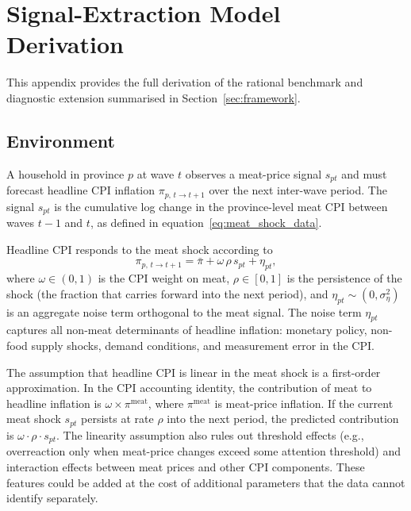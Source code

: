 
\section{Signal-Extraction Model Derivation}\label{app:model}

This appendix provides the full derivation of the rational
benchmark and diagnostic extension summarised in
Section~\ref{sec:framework}.

\subsection{Environment}

A household in province $p$ at wave $t$ observes a meat-price
signal $s_{pt}$ and must forecast headline CPI inflation
$\pi_{p,\,t \to t+1}$ over the next inter-wave period.
The signal $s_{pt}$ is the cumulative log change in the
province-level meat CPI between waves $t-1$ and $t$, as
defined in equation~\eqref{eq:meat_shock_data}.

Headline CPI responds to the meat shock according to
\[
  \pi_{p,\,t \to t+1}
  = \bar{\pi} + \omega\,\rho\,s_{pt} + \eta_{pt},
\]
where $\omega \in (0,1)$ is the CPI weight on meat,
$\rho \in [0,1]$ is the persistence of the shock
(the fraction that carries forward into the next period),
and $\eta_{pt} \sim (0, \sigma_\eta^2)$ is an aggregate
noise term orthogonal to the meat signal.
The noise term $\eta_{pt}$ captures all non-meat determinants
of headline inflation: monetary policy, non-food supply shocks,
demand conditions, and measurement error in the CPI.

The assumption that headline CPI is linear in the meat shock is
a first-order approximation.
In the CPI accounting identity, the contribution of meat to
headline inflation is $\omega \times \pi^{\text{meat}}$, where
$\pi^{\text{meat}}$ is meat-price inflation.
If the current meat shock $s_{pt}$ persists at rate $\rho$
into the next period, the predicted contribution is
$\omega \cdot \rho \cdot s_{pt}$.
The linearity assumption also rules out threshold effects
(e.g., overreaction only when meat-price changes exceed
some attention threshold) and interaction effects between
meat prices and other CPI components.
These features could be added at the cost of additional
parameters that the data cannot identify separately.

